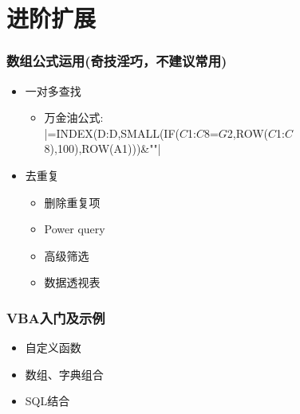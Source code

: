 \section{进阶扩展}
\begin{frame}[fragile]
\frametitle{数组公式运用(奇技淫巧，不建议常用)}
\begin{itemize}
		\item<+-> 一对多查找
		
		\begin{itemize}
			\item 万金油公式:\\
			|=INDEX(D:D,SMALL(IF($C$1:$C$8=$G$2,ROW($C$1:$C$8),100),ROW(A1)))&""|
		\end{itemize}
%	
		\item<+-> 去重复
		
		\begin{itemize}
			\item 删除重复项
			\item Power query
			\item 高级筛选
			\item 数据透视表
		\end{itemize}
\end{itemize}
\end{frame}


\begin{frame}[fragile]
	\frametitle{VBA入门及示例}
	\begin{itemize}
		\item 自定义函数
		\item 数组、字典组合
		\item SQL结合
	\end{itemize}
\end{frame}


